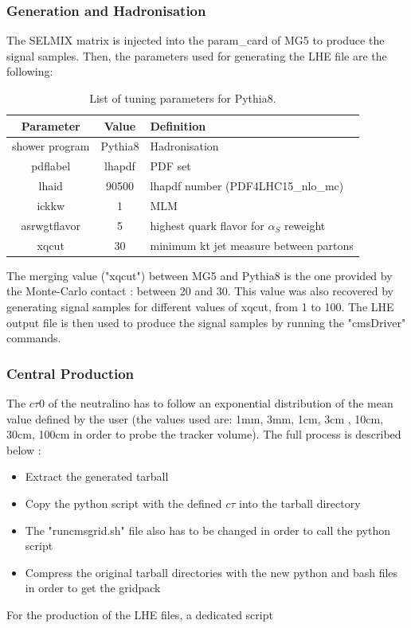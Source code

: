 \documentclass{cernatlasnote}
\begin{document}
 \subsubsection{Generation and Hadronisation}
The SELMIX matrix is injected into the param\_card of MG5 to produce the signal samples.
Then, the parameters used for generating the LHE file are the following:
\begin{table}[h]
\begin{center}
\begin{tabular}{ |c|c|m{8cm}| } 
    \hline
    \rowcolor{lightgray} 
    Parameter & Value & Definition\\
    \hline 
    shower program & Pythia8 & Hadronisation \\
    \hline
    pdflabel & lhapdf & PDF set  \\ 
    \hline
    lhaid & 90500 & lhapdf number (PDF4LHC15\_nlo\_mc)\\
    \hline
    ickkw & 1 & MLM \\
    \hline
    asrwgtflavor & 5 & highest quark flavor for $\alpha_{S}$ reweight \\
    \hline
    xqcut & 30 & minimum kt jet measure between partons \\
    \hline
\end{tabular}
\end{center}
\caption{List of tuning parameters for Pythia8.}
\label{TAB : GENPARA}
\end{table}
\FloatBarrier 
The merging value ("xqcut") between MG5 and Pythia8 is the one provided by the Monte-Carlo contact : between 20 and 30. This value was also recovered by generating signal samples for different values of xqcut, from 1 to 100. The LHE output file is then used to produce the signal samples by running the "cmsDriver" commands.

\subsubsection{Central Production}
    The $c\tau 0$ of the neutralino has to follow an exponential distribution of the mean value defined by the user (the values used are: 1mm, 3mm, 1cm, 3cm , 10cm, 30cm, 100cm in order to probe the tracker volume). The full process is described below :
        \begin{itemize}
            \item Extract the generated tarball 
            \item Copy the python script with the defined $c\tau$ into the tarball directory
            \item The "runcmsgrid.sh" file also has to be changed in order to call the python script
            \item Compress the original tarball directories with the new python and bash files in order to get the gridpack
        \end{itemize}
        For the production of the LHE files, a dedicated script
\newpage
\end{document}
